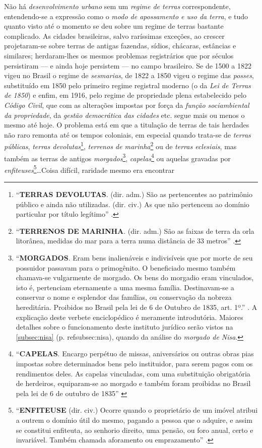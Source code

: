 Não há \textit{desenvolvimento urbano} sem um \textit{regime de terras} correspondente, entendendo-se a expressão como o \textit{modo de apossamento e uso da terra}, e tudo quanto visto até o momento se deu sobre um regime de terras bastante complicado. As cidades brasileiras, salvo raríssimas exceções, ao crescer projetaram-se sobre terras de antigas fazendas, sídios, chácaras, estâncias e similares; herdaram-lhes os mesmos problemas registrários que por séculos persistiram --- e ainda hoje persistem --- no campo brasileiro. Se de 1500 a 1822 vigeu no Brasil o regime de \textit{sesmarias}, de 1822 a 1850 vigeu o regime das \textit{posses}, substituído em 1850 pelo primeiro regime registral moderno (o da \textit{Lei de Terras de 1850}) e enfim, em 1916, pelo regime de propriedade plena estabelecido pelo \textit{Código Civil}, que com as alterações impostas por força da \textit{função sociambiental da propriedade}, da \textit{gestão democrática das cidades} etc. segue mais ou menos o mesmo até hoje. O problema está em que a titulação de terras de tais herdades não raro remonta até os tempos coloniais, em especial quando trata-se de \textit{terras públicas}, \textit{terras devolutas}\footnote{``\textbf{TERRAS DEVOLUTAS}. (dir. adm.) São as pertencentes ao patrimônio público e ainda não utilizadas. (dir. civ.) As que não pertencem ao domínio particular por título legítimo'' \cite[p.~349]{soibelman_enciclo_1979}.}, \textit{terrenos de marinha}\footnote{``\textbf{TERRENOS DE MARINHA}. (dir. adm.) São as faixas de terra da orla litorânea, medidas do mar para a terra numa distância de 33 metros'' \cite[p.~349]{soibelman_enciclo_1979}.} ou de \textit{terras eclesiais}, mas também as terras de antigos \textit{morgados}\footnote{``\textbf{MORGADOS}. Eram bens inalienáveis e indivisíveis que por morte de seu possuidor passavam para o primogênito. O beneficiado mesmo também chamava-se vulgarmente de morgado. Os bens do morgadio eram vinculados, isto é, pertenciam eternamente a uma mesma família. Destinavam-se a conservar o nome e esplendor das famílias, ou conservação da nobreza hereditária. Proibidos no Brasil pela lei de 6 de Outubro de 1835, art. 1º.'' \cite[p.~242]{soibelman_enciclo_1979}. A explicação deste verbete enciclopédico é meramente introdutória. Maiores detalhes sobre o funcionamento deste instituto jurídico serão vistos na \autoref{subsec:nisa} (p. \pageref{sec:insbrascontint}ref{subsec:nisa}), quando da análise do \textit{morgado de Nisa}.}, \textit{capelas}\footnote{``\textbf{CAPELAS}. Encargo perpétuo de missas, aniversários ou outras obras pias impostas sobre determinados bens pelo instituidor, para serem pagos com os rendimentos deles. As capelas vinculadas, com uma substituição obrigatória de herdeiros, equiparam-se ao morgado e também foram proibidas no Brasil pela lei de 6 de outubro de 1835'' \cite[p.~57]{soibelman_enciclo_1979}} ou aquelas gravadas por \textit{enfiteuses}\footnote{``\textbf{ENFITEUSE} (dir. civ.) Ocorre quando o proprietário de um imóvel atribui a outrem o domínio útil do mesmo, pagando a pessoa que o adquire, e assim se constitui enfiteuta, ao senhorio direito, uma pensão, ou foro anual, certo e invariável. Também chamada aforamento ou emprazamento'' \cite[p.~146]{soibelman_enciclo_1979}.}\dots Coisa difícil, raridade mesmo era encontrar 